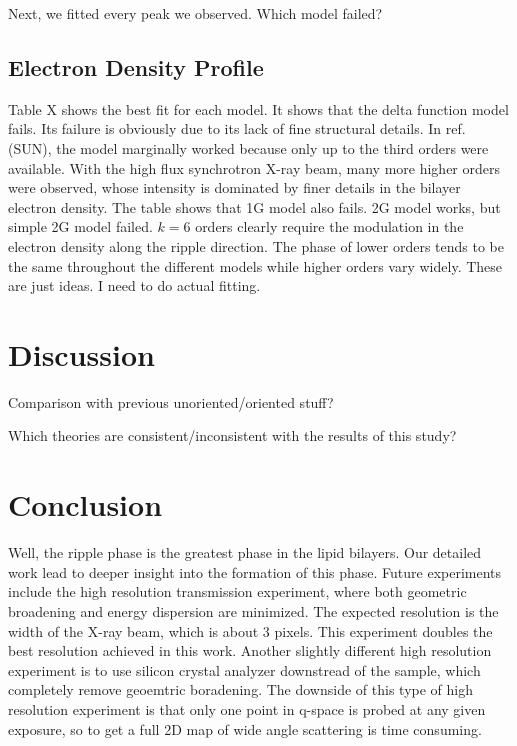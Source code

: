 Next, we fitted every peak we observed. Which model failed?

\subsection{Electron Density Profile}
Table X shows the best fit for each model. It shows that the delta function
model fails. Its failure is obviously due to its lack of fine structural 
details. In ref. (SUN), the model marginally worked because only up to
the third orders were available. With the high flux synchrotron X-ray beam,
many more higher orders were observed, whose intensity is dominated by
finer details in the bilayer electron density. The table shows that
1G model also fails. 2G model works, but simple 2G model failed. $k=6$ orders
clearly require the modulation in the electron density along the ripple 
direction. The phase of lower orders tends to be the same throughout
the different models while higher orders vary widely. These are just ideas.
I need to do actual fitting.

\section{Discussion}
Comparison with previous unoriented/oriented stuff?

Which theories are consistent/inconsistent with the results of this study?


\section{Conclusion}
Well, the ripple phase is the greatest phase in the lipid bilayers. Our detailed
work lead to deeper insight into the formation of this phase. Future experiments
include the high resolution transmission experiment, where both geometric 
broadening and energy dispersion are minimized. The expected resolution 
is the width of the X-ray beam, which is about 3 pixels. This experiment 
doubles the best resolution achieved in this work. 
Another slightly different high resolution experiment is to use silicon 
crystal analyzer downstread of the sample, which completely remove geoemtric
boradening. The downside of this type of high resolution experiment is that
only one point in q-space is probed at any given exposure, so to get a full
2D map of wide angle scattering is time consuming.  
